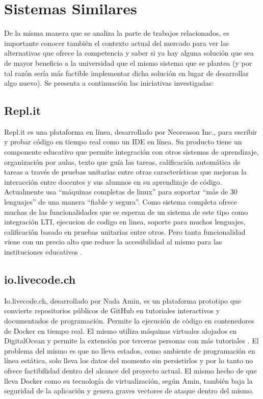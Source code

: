 \section{Sistemas Similares}
De la misma manera que se analiza la parte de trabajos relacionados, es importante conocer también el contexto actual del mercado para ver las alternativas que ofrece la competencia y saber si ya hay alguna solución que sea de mayor beneficio a la universidad que el mismo sistema que se plantea (y por tal razón sería más factible implementar dicha solución en lugar de desarrollar algo nuevo). Se presenta a continuación las iniciativas investigadas:

\subsection{Repl.it}
Repl.it es una plataforma en línea, desarrollado por Neoreason Inc., para escribir y probar código en tiempo real como un IDE en línea. Su producto tiene un componente educativo que permite integración con otros sistemas de aprendizaje, organización por aulas, texto que guía las tareas, calificación automática de tareas a través de pruebas unitarias entre otras características que mejoran la interacción entre docentes y sus alumnos en su aprendizaje de código. Actualmente usa “máquinas completas de linux” para soportar “más de 30 lenguajes” de una manera “fiable y segura”. Como sistema completa ofrece muchas de las funcionalidades que se esperan de un sistema de este tipo como integración LTI,  ejecucion de codigo en linea, soporte para muchos lenguajes, calificación basado en pruebas unitarias entre otros. Pero tanta funcionalidad viene con un precio alto que reduce la accesibilidad al mismo para las instituciones educativos \citep{Repl.it-Home}.

\subsection{io.livecode.ch}
Io.livecode.ch, desarrollado por Nada Amin, es un plataforma prototipo que convierte repositorios públicos de GitHub en tutoriales interactivos y documentados de programación. Permite la ejecución de código en contenedores de Docker en tiempo real. El mismo utiliza máquinas virtuales alojados en DigitalOcean y permite la extensión por terceras personas con más tutoriales  \citep{io.livecode.ch}. El problema del mismo es que no lleva estados, como ambiente de programación en línea estática, solo lleva los datos del momento sin persistirlos y por lo tanto no ofrece factibilidad dentro del alcance del proyecto actual. El mismo hecho de que lleva Docker como su tecnología de virtualización, según Amin, también baja la seguridad de la aplicación y genera graves vectores de ataque dentro del mismo.

